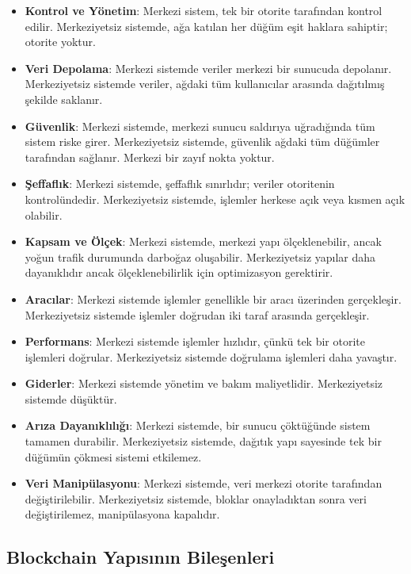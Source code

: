 \begin{itemize}
    \item \textbf{Kontrol ve Yönetim}: Merkezi sistem, tek bir otorite tarafından kontrol edilir. Merkeziyetsiz sistemde, ağa katılan her düğüm eşit haklara sahiptir; otorite yoktur.
    \item \textbf{Veri Depolama}: Merkezi sistemde veriler merkezi bir sunucuda depolanır. Merkeziyetsiz sistemde veriler, ağdaki tüm kullanıcılar arasında dağıtılmış şekilde saklanır.
    \item \textbf{Güvenlik}: Merkezi sistemde, merkezi sunucu saldırıya uğradığında tüm sistem riske girer. Merkeziyetsiz sistemde, güvenlik ağdaki tüm düğümler tarafından sağlanır. Merkezi bir zayıf nokta yoktur.
    \item \textbf{Şeffaflık}: Merkezi sistemde, şeffaflık sınırlıdır; veriler otoritenin kontrolündedir. Merkeziyetsiz sistemde, işlemler herkese açık veya kısmen açık olabilir.
    \item \textbf{Kapsam ve Ölçek}: Merkezi sistemde, merkezi yapı ölçeklenebilir, ancak yoğun trafik durumunda darboğaz oluşabilir. Merkeziyetsiz yapılar daha dayanıklıdır ancak ölçeklenebilirlik için optimizasyon gerektirir.
    \item \textbf{Aracılar}: Merkezi sistemde işlemler genellikle bir aracı üzerinden gerçekleşir. Merkeziyetsiz sistemde işlemler doğrudan iki taraf arasında gerçekleşir.
    \item \textbf{Performans}: Merkezi sistemde işlemler hızlıdır, çünkü tek bir otorite işlemleri doğrular. Merkeziyetsiz sistemde doğrulama işlemleri daha yavaştır.
    \item \textbf{Giderler}: Merkezi sistemde yönetim ve bakım maliyetlidir. Merkeziyetsiz sistemde düşüktür.
    \item \textbf{Arıza Dayanıklılığı}: Merkezi sistemde, bir sunucu çöktüğünde sistem tamamen durabilir. Merkeziyetsiz sistemde, dağıtık yapı sayesinde tek bir düğümün çökmesi sistemi etkilemez.
    \item \textbf{Veri Manipülasyonu}: Merkezi sistemde, veri merkezi otorite tarafından değiştirilebilir. Merkeziyetsiz sistemde, bloklar onayladıktan sonra veri değiştirilemez, manipülasyona kapalıdır.
\end{itemize}

\subsection{Blockchain Yapısının Bileşenleri}

